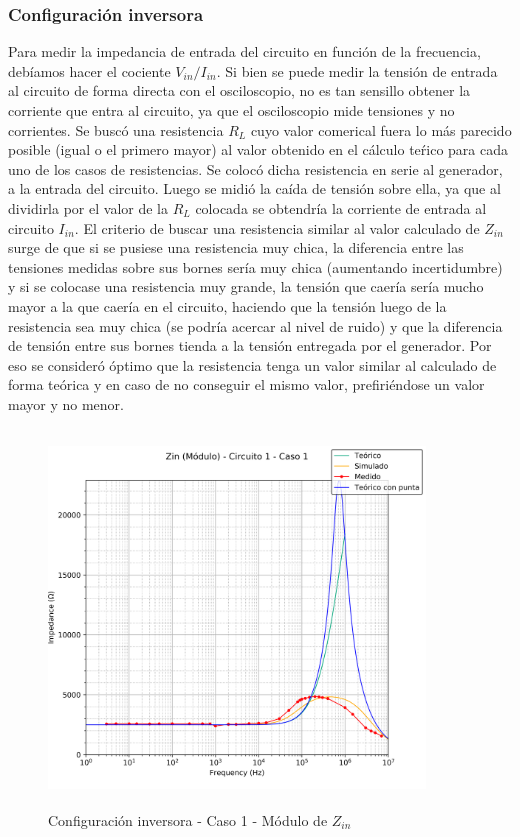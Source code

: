 \subsubsection*{Configuraci\'on inversora}
Para medir la impedancia de entrada del circuito en funci\'on de la frecuencia, 
deb\'iamos hacer el cociente $V_{in}/I_{in}$. Si bien se puede medir la tensi\'on 
de entrada al circuito de forma directa con el osciloscopio, 
no es tan sensillo obtener la corriente que entra al circuito, ya que el osciloscopio 
mide tensiones y no corrientes. Se busc\'o una resistencia $R_L$ cuyo valor comerical 
fuera lo m\'as parecido posible (igual o el primero mayor) al valor obtenido en 
el c\'alculo te\'rico para cada uno de los casos de resistencias. Se coloc\'o dicha 
resistencia en serie al generador, a la entrada del circuito. Luego se midi\'o la ca\'ida 
de tensi\'on sobre ella, ya que al dividirla por el valor de la $R_L$ colocada se obtendr\'ia 
la corriente de entrada al circuito $I_{in}$. El criterio de buscar una resistencia similar 
al valor calculado de $Z_{in}$ surge de que si se pusiese una resistencia muy chica, 
la diferencia entre las tensiones medidas sobre sus bornes ser\'ia muy chica 
(aumentando incertidumbre) y si se colocase una resistencia muy grande, 
la tensi\'on que caer\'ia ser\'ia mucho mayor a la que caer\'ia en el circuito, 
haciendo que la tensi\'on luego de la resistencia sea muy chica (se podr\'ia 
acercar al nivel de ruido) y que la diferencia de tensi\'on entre sus bornes tienda 
a la tensi\'on entregada por el generador. Por eso se consider\'o \'optimo que la 
resistencia tenga un valor similar al calculado de forma te\'orica y en caso de no 
conseguir el mismo valor, prefiri\'endose un valor mayor y no menor. 

\begin{figure}[H] %
	\centering
	\includegraphics[width=10cm,height=10cm,keepaspectratio]{../EJ1/00GRAFICOS/c1c1/c1c1ZINpunta.png}
	\caption{Configuración inversora - Caso 1 - M\'odulo de $Z_{in}$}
	\label{c1c1zinM}
\end{figure}

